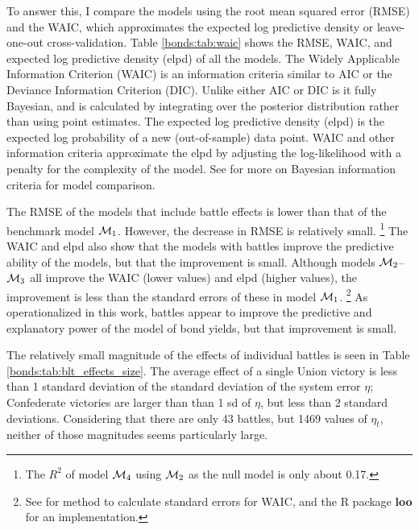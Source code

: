 To answer this, I compare the models using the root mean squared error (RMSE) and the WAIC, which approximates the expected log predictive density or leave-one-out cross-validation.
Table \ref{bonds:tab:waic} shows the RMSE, WAIC, and expected log predictive density (elpd) of all the models.
The Widely Applicable Information Criterion (WAIC) \parencite{Watanabe2010} is an information criteria similar to AIC or the Deviance Information Criterion (DIC).
Unlike either AIC or DIC is it fully Bayesian, and is calculated by integrating over the posterior distribution rather than using point estimates.
The expected log predictive density (elpd) is the expected log probability of a new (out-of-sample) data point.
WAIC and other information criteria approximate the elpd by adjusting the  log-likelihood with a penalty for the complexity of the model.
See \textcites[Ch. 7]{GelmanCarlinSternEtAl2013a}{GelmanHwangVehtari2014a}{GelmanVehtari2014a} for more on Bayesian information criteria for model comparison.

The  RMSE of the models that include battle effects is lower than that of the benchmark model $\mathcal{M}_{\text{1}}$. 
However, the decrease in  RMSE is relatively small.%
\footnote{The $R^{2}$ of model $\mathcal{M}_{\text{4}}$ using $\mathcal{M}_{\text{2}}$ as the null model is only about 0.17.}
The WAIC and elpd also show that the models with battles improve the predictive ability of the models, but that the improvement is small.
Although models $\mathcal{M}_{\text{2}}$--$\mathcal{M}_{\text{3}}$ all improve the WAIC (lower values) and elpd (higher values), the improvement is less than the standard errors of these  in model $\mathcal{M}_{\text{1}}$.%
\footnote{See \textcite{GelmanVehtari2014a} for method to calculate standard errors for WAIC, and the R package \textbf{loo} for an implementation.}
As operationalized in this work, battles appear to improve the predictive and explanatory power of the model of bond yields, but that improvement is small.

The relatively small magnitude of the effects of individual battles is seen in Table \ref{bonds:tab:blt_effects_size}.
The average effect of a single Union victory is less than 1 standard deviation of the standard deviation of the system error $\eta$; Confederate victories are larger than than 1 sd of $\eta$, but less than 2 standard deviations.
Considering that there are only 43 battles, but 1469 values of $\eta_{t}$, neither of those magnitudes seems particularly large.

